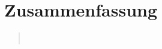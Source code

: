     
\section{Zusammenfassung}
\begin{quote}

     \\
\end{quote}%
         



\begin{thebibliography}{999}
%      



\end{thebibliography}


  	    
